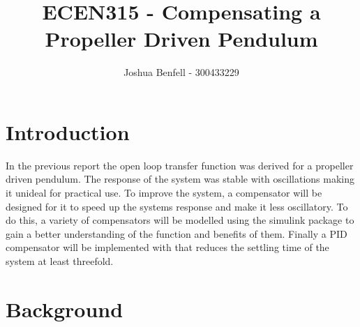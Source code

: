 \documentclass[a4paper, 11pt, compsoc]{IEEEtran}
\title{ECEN315 - Compensating a Propeller Driven Pendulum }
\author{Joshua Benfell - 300433229}
\begin{document}
    \maketitle
    \IEEEdisplaynontitleabstractindextext

    \section{Introduction}\label{sec:intro}
		In the previous report the open loop transfer function was derived for a propeller driven pendulum. The response of the system was stable with oscillations making it unideal for practical use. To improve the system, a compensator will be designed for it to speed up the systems response and make it less oscillatory. To do this, a variety of compensators will be modelled using the simulink package to gain a better understanding of the function and benefits of them. Finally a PID compensator will be implemented with that reduces the settling time of the system at least threefold.
	\section{Background}\label{sec:bg}
\end{document}
